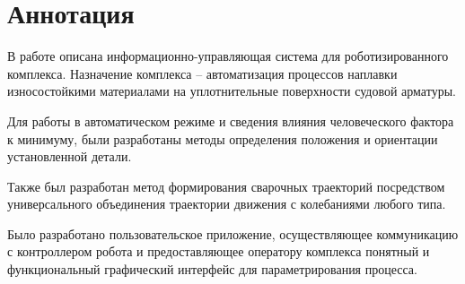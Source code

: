\chapter{Аннотация}
В работе описана информационно-управляющая система для роботизированного комплекса.
Назначение комплекса -- автоматизация процессов наплавки износостойкими материалами на уплотнительные поверхности судовой арматуры.

Для работы в автоматическом режиме и сведения влияния человеческого фактора к минимуму, были разработаны методы определения положения и ориентации установленной детали.

Также был разработан метод формирования сварочных траекторий посредством универсального объединения траектории движения с колебаниями любого типа.

Было разработано пользовательское приложение, осуществляющее коммуникацию с контроллером робота и предоставляющее оператору комплекса понятный и функциональный графический интерфейс для параметрирования процесса.
